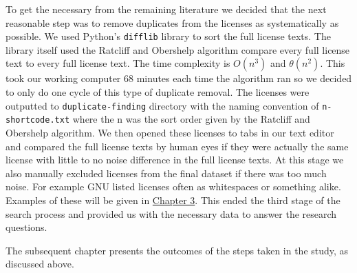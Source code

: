 To get the necessary from the remaining literature we decided that the next reasonable step was to remove duplicates from the licenses as systematically as possible. We used Python's \texttt{difflib} library to sort the full license texts. The library itself used the Ratcliff and Obershelp algorithm compare every full license text to every full license text. The time complexity is $O(n^3)$ and $\theta(n^2)$. This took our working computer 68 minutes each time the algorithm ran so we decided to only do one cycle of this type of duplicate removal. The licenses were outputted to \texttt{duplicate-finding} directory with the naming convention of \texttt{n-shortcode.txt} where the n was the sort order given by the Ratcliff and Obershelp algorithm. We then opened these licenses to tabs in our text editor and compared the full license texts by human eyes if they were actually the same license with little to no noise difference in the full license texts. At this stage we also manually excluded licenses from the final dataset if there was too much noise. For example GNU listed licenses often as whitespaces or something alike. Examples of these will be given in \hyperref[results]{Chapter 3}. This ended the third stage of the search process and provided us with the necessary data to answer the research questions.

The subsequent chapter presents the outcomes of the steps taken in the study, as discussed above.